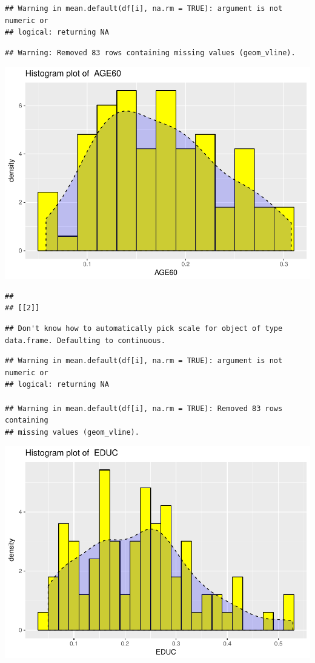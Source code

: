 \documentclass[]{article}
\begin{document}
\begin{verbatim}
## Warning in mean.default(df[i], na.rm = TRUE): argument is not numeric or
## logical: returning NA
\end{verbatim}

\begin{verbatim}
## Warning: Removed 83 rows containing missing values (geom_vline).
\end{verbatim}

\includegraphics{Desc_stats_files/figure-latex/unnamed-chunk-2-1.pdf}

\begin{verbatim}
## 
## [[2]]
\end{verbatim}

\begin{verbatim}
## Don't know how to automatically pick scale for object of type data.frame. Defaulting to continuous.
\end{verbatim}

\begin{verbatim}
## Warning in mean.default(df[i], na.rm = TRUE): argument is not numeric or
## logical: returning NA

## Warning in mean.default(df[i], na.rm = TRUE): Removed 83 rows containing
## missing values (geom_vline).
\end{verbatim}

\includegraphics{Desc_stats_files/figure-latex/unnamed-chunk-2-2.pdf}
\end{document}
